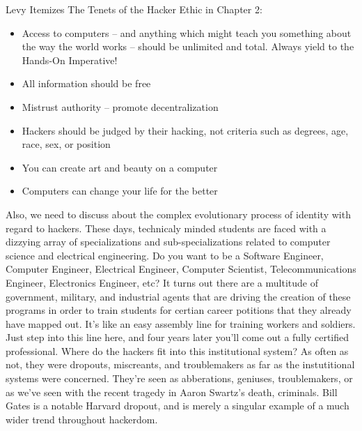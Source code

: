 \documentclass[11pt]{article}
\begin{document}
Levy Itemizes The Tenets of the Hacker Ethic in Chapter 2:
\begin{itemize}
\item Access to computers -- and anything which might teach you something about the way the world works -- should be unlimited and total. Always yield to the Hands-On Imperative!
\item All information should be free
\item Mistrust authority -- promote decentralization
\item Hackers should be judged by their hacking, not criteria such as degrees, age, race, sex, or position
\item You can create art and beauty on a computer
\item Computers can change your life for the better
\end{itemize}

Also, we need to discuss about the complex evolutionary process of identity with regard to hackers. These days, technicaly minded students are faced with a dizzying array of specializations and sub-specializations related to computer science and electrical engineering. Do you want to be a Software Engineer, Computer Engineer, Electrical Engineer, Computer Scientist, Telecommunications Engineer, Electronics Engineer, etc? It turns out there are a multitude of government, military, and industrial agents that are driving the creation of these programs in order to train students for certian career potitions that they already have mapped out. It's like an easy assembly line for training workers and soldiers. Just step into this line here, and four years later you'll come out a fully certified professional. Where do the hackers fit into this institutional system? As often as not, they were dropouts, miscreants, and troublemakers as far as the instutitional systems were concerned. They're seen as abberations, geniuses, troublemakers, or as we've seen with the recent tragedy in Aaron Swartz's death, criminals. Bill Gates is a notable Harvard dropout, and is merely a singular example of a much wider trend throughout hackerdom.
\end{document}

